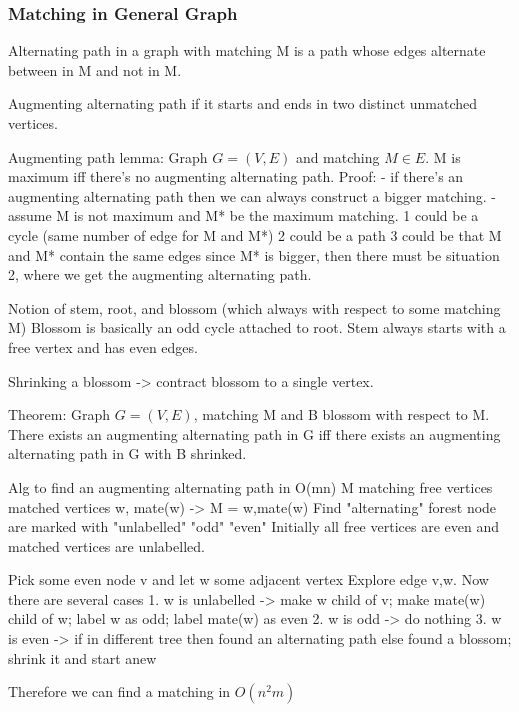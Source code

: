 \documentclass{article}
\begin{document}
\subsubsection{Matching in General Graph}
Alternating path in a graph with matching M is a path whose edges alternate
between in M and not in M.

Augmenting alternating path if it starts and ends in two distinct unmatched
vertices.

Augmenting path lemma:
Graph $G=(V,E)$ and matching $M\in E$.  M is maximum iff there's no augmenting
alternating path.
Proof: 
- if there's an augmenting alternating path then we can always construct a bigger matching.
- assume M is not maximum and M* be the maximum matching.
	1 could be a cycle (same number of edge for M and M*)
	2 could be a path
	3 could be that M and M* contain the same edges
  since M* is bigger, then there must be situation 2, where we get the augmenting alternating path.

Notion of stem, root, and blossom (which always with respect to some matching M)
Blossom is basically an odd cycle attached to root.
Stem always starts with a free vertex and has even edges.

Shrinking a blossom -> contract blossom to a single vertex.

Theorem:
Graph $G=(V,E)$, matching M and B blossom with respect to M.  There exists an
augmenting alternating path in G iff there exists an augmenting alternating
path in G with B shrinked.

Alg to find an augmenting alternating path in O(mn)
M matching
free vertices
matched vertices w, mate(w) -> M = {w,mate(w)}
Find "alternating" forest
	node are marked with "unlabelled" "odd" "even"
Initially all free vertices are even and matched vertices are unlabelled.

Pick some even node v and let w some adjacent vertex
Explore edge {v,w}.  Now there are several cases
1. w is unlabelled -> make w child of v; make mate(w) child of w; label w as odd; label mate(w) as even
2. w is odd -> do nothing
3. w is even -> if in different tree then found an alternating path
		else found a blossom; shrink it and start anew

Therefore we can find a matching in $O(n^2m)$
\end{document}
